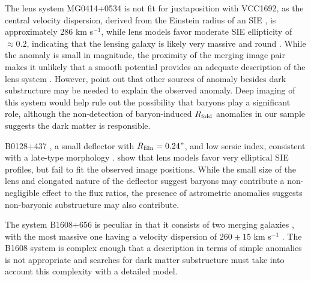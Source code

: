 \begin{itemize}
	\vspace{1cm} The lens system MG0414+0534 is not fit for juxtaposition with VCC1692, as the central velocity dispersion, derived from the Einstein radius of an SIE \citep{Xu++15}, is approximately 286 km s$^{-1}$, while lens models favor moderate SIE ellipticity of $\approx 0.2$, indicating that the lensing galaxy is likely very massive and round \citep{Hewitt++92}. While the anomaly is small in magnitude, the proximity of the merging image pair makes it unlikely that a smooth potential provides an adequate description of the lens system \citep{Minezaki++09,Keeton05,Xu++15}. However, \citet{Xu++15} point out that other sources of anomaly besides dark substructure may be needed to explain the observed anomaly. Deep imaging of this system would help rule out the possibility that baryons play a significant role, although the non-detection of baryon-induced $R_{\rm{fold}}$ anomalies in our sample suggests the dark matter is responsible. 
	
	\vspace{1cm} B0128+437 \citep{Phillips++00}, a small deflector with $R_{\rm{Ein}}=0.24"$, and low sersic index, consistent with a late-type morphology \citep{Lagattuta++10}. \citep{Biggs++04} show that lens models favor very elliptical SIE profiles, but fail to fit the observed image positions. While the small size of the lens and elongated nature of the deflector suggest baryons may contribute a non-negligible effect to the flux ratios, the presence of astrometric anomalies suggests non-baryonic substructure may also contribute.
	
	The system B1608+656 \citep{Fassnacht++96} is peculiar in that it consists of two merging galaxies \citep{Fassnacht++02}, with the most massive one having a velocity dispersion of $260\pm15$ km s$^{-1}$ \citep{Suyu++10}. The B1608 system is complex enough that a  description in terms of simple anomalies is not appropriate and searches for dark matter substructure must take into account this complexity with a detailed model.
	

\end{itemize}
